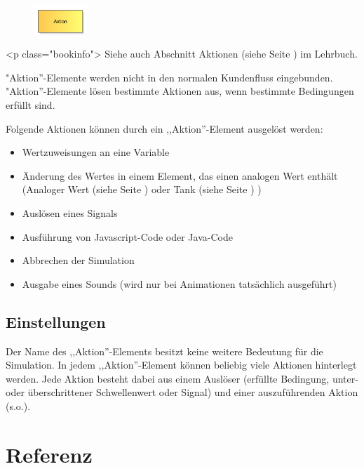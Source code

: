 \begin{figure}
\vspace{-22pt}
\includegraphics[width=2cm]{imageModelElementAction.png}
\vspace{-22pt}
\end{figure}

<p class="bookinfo">
Siehe auch Abschnitt Aktionen (siehe Seite \pageref{ref:book:8.12.1}) im Lehrbuch.

"Aktion''-Elemente werden nicht in den normalen Kundenfluss eingebunden.
"Aktion''-Elemente lösen bestimmte Aktionen aus, wenn bestimmte Bedingungen erfüllt sind.

Folgende Aktionen können durch ein ,,Aktion''-Element ausgelöst werden:

\begin{itemize}
  \item Wertzuweisungen an eine Variable 
  \item Änderung des Wertes in einem Element, das einen analogen Wert enthält
  (Analoger Wert (siehe Seite \pageref{ref:ModelElementAnalogValue}) oder Tank (siehe Seite \pageref{ref:ModelElementTank}) )
  \item Auslösen eines Signals 
  \item Ausführung von Javascript-Code oder Java-Code 
  \item Abbrechen der Simulation 
  \item Ausgabe eines Sounds (wird nur bei Animationen tatsächlich ausgeführt) 
\end{itemize}

\subsection*{Einstellungen}

Der Name des ,,Aktion''-Elements besitzt keine weitere Bedeutung für die Simulation.
In jedem ,,Aktion''-Element können beliebig viele Aktionen hinterlegt werden. Jede
Aktion besteht dabei aus einem Auslöser (erfüllte Bedingung, unter- oder überschrittener
Schwellenwert oder Signal) und einer auszuführenden Aktion (s.o.).


\section{Referenz}
\label{ref:ModelElementReference}

